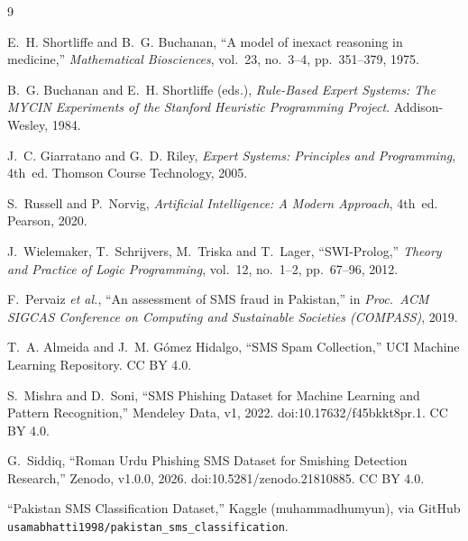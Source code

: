 \documentclass[11pt,a4paper]{article}
\begin{document}
\begin{thebibliography}{9}
\small

E.~H. Shortliffe and B.~G. Buchanan,
``A model of inexact reasoning in medicine,''
\emph{Mathematical Biosciences}, vol.~23, no.~3--4, pp.~351--379, 1975.

B.~G. Buchanan and E.~H. Shortliffe (eds.),
\emph{Rule-Based Expert Systems: The MYCIN Experiments of the Stanford Heuristic Programming Project}.
Addison-Wesley, 1984.

J.~C. Giarratano and G.~D. Riley,
\emph{Expert Systems: Principles and Programming}, 4th~ed. Thomson Course Technology, 2005.

S.~Russell and P.~Norvig,
\emph{Artificial Intelligence: A Modern Approach}, 4th~ed. Pearson, 2020.

J.~Wielemaker, T.~Schrijvers, M.~Triska and T.~Lager,
``SWI-Prolog,'' \emph{Theory and Practice of Logic Programming}, vol.~12, no.~1--2, pp.~67--96, 2012.

F.~Pervaiz \emph{et al.},
``An assessment of SMS fraud in Pakistan,''
in \emph{Proc.\ ACM SIGCAS Conference on Computing and Sustainable Societies (COMPASS)}, 2019.

T.~A. Almeida and J.~M. G\'omez Hidalgo,
``SMS Spam Collection,'' UCI Machine Learning Repository. CC BY 4.0.

S.~Mishra and D.~Soni,
``SMS Phishing Dataset for Machine Learning and Pattern Recognition,''
Mendeley Data, v1, 2022. doi:10.17632/f45bkkt8pr.1. CC BY 4.0.

G.~Siddiq,
``Roman Urdu Phishing SMS Dataset for Smishing Detection Research,''
Zenodo, v1.0.0, 2026. doi:10.5281/zenodo.21810885. CC BY 4.0.

``Pakistan SMS Classification Dataset,'' Kaggle (muhammadhumyun), via GitHub
\texttt{usamabhatti1998/pakistan\_sms\_classification}.

\end{thebibliography}
\end{document}
